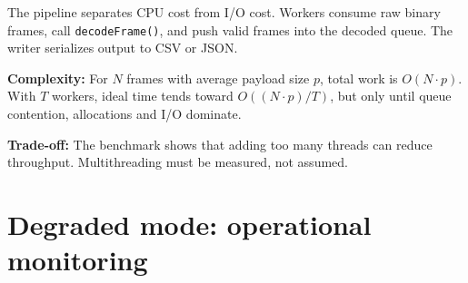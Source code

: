 \documentclass[10pt,a4paper]{article}
\newcommand{\complexity}[1]{\textbf{Complexity:} #1}
\newcommand{\tradeoff}[1]{\textbf{Trade-off:} #1}
\begin{document}
The pipeline separates CPU cost from I/O cost. Workers consume raw binary frames, call \texttt{decodeFrame()}, and push valid frames into the decoded queue. The writer serializes output to CSV or JSON.

\complexity{For $N$ frames with average payload size $p$, total work is $O(N \cdot p)$. With $T$ workers, ideal time tends toward $O((N \cdot p)/T)$, but only until queue contention, allocations and I/O dominate.}

\tradeoff{The benchmark shows that adding too many threads can reduce throughput. Multithreading must be measured, not assumed.}

\section{Degraded mode: operational monitoring}
\end{document}
